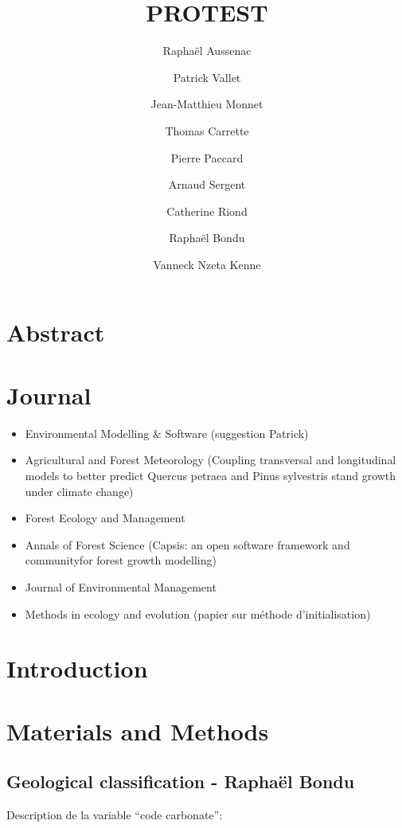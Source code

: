 \documentclass[a4paper]{article}
\title{PROTEST}
\author[1]{Raphaël Aussenac}
\author[1]{Patrick Vallet}
\author[1]{Jean-Matthieu Monnet}
\author[2]{Thomas Carrette}
\author[3]{Pierre Paccard}
\author[4]{Arnaud Sergent}
\author[5]{Catherine Riond}
\author[6]{Raphaël Bondu}
\author[1]{Vanneck Nzeta Kenne}
\affil[1]{IRSTEA grenoble}
\affil[2]{FCBA grenoble}
\affil[3]{PNR Bauges}
\affil[4]{IRSTEA Bordeaux}
\affil[5]{ONF}
\affil[6]{???}
\date{}
\begin{document}
\maketitle

\section*{Abstract}

\section*{Journal}
\begin{itemize}
    \item Environmental Modelling \& Software (suggestion Patrick)
    \item Agricultural and Forest Meteorology (Coupling transversal and longitudinal models to better predict Quercus petraea and Pinus sylvestris stand growth under climate change)
    \item Forest Ecology and Management
    \item Annals of Forest Science (Capsis: an open software framework and communityfor forest growth modelling)
    \item Journal of Environmental Management
    \item Methods in ecology and evolution (papier sur méthode d'initialisation)
\end{itemize}

\section*{Introduction}

\citep{cardinale2012biodiversity}

\section*{Materials and Methods}


\subsection*{Geological classification - Raphaël Bondu}

Description de la variable “code carbonate”:
\end{document}
